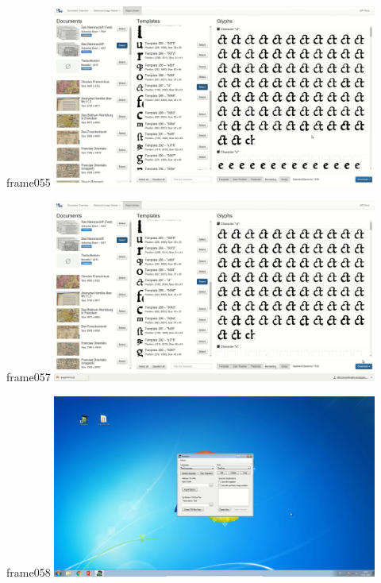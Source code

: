 \documentclass{beamer}
\begin{document}
\begin{frame}{frame055}
\includegraphics[width=0.8\textwidth]{output/exported-frames/frame055.png}
\note{}
\end{frame}

\begin{frame}{frame057}
\includegraphics[width=0.8\textwidth]{output/exported-frames/frame057.png}
\note{}
\end{frame}

\begin{frame}{frame058}
\includegraphics[width=0.8\textwidth]{output/exported-frames/frame058.png}
\note{}
\end{frame}
\end{document}
